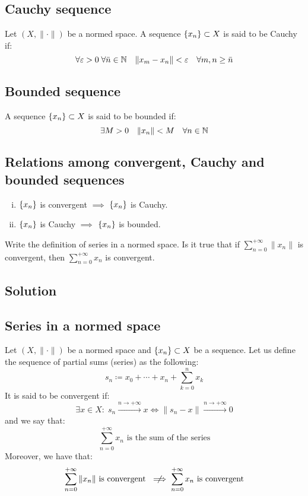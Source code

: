 \subsection{Cauchy sequence}
Let $(X, \| \cdot \|)$ be a normed space. A sequence $\{ x_n \} \subset X$ is said to be Cauchy if:
\[ \forall \varepsilon > 0 \; \forall \bar{n} \in \mathbb{N} \quad \| x_m - x_n \| < \varepsilon \quad \forall m,n \geq \bar{n} \]

\subsection{Bounded sequence}
A sequence $\{ x_n \} \subset X$ is said to be bounded if:
\[ \exists M>0 \quad \|x_n\| < M \quad \forall n \in \mathbb{N} \]

\subsection{Relations among convergent, Cauchy and bounded sequences}
\begin{enumerate}[i)]
    \item $\{ x_n \}$ is convergent $\implies$ $\{ x_n \}$ is Cauchy.
    \item $\{ x_n \}$ is Cauchy $\implies$ $\{ x_n \}$ is bounded.
\end{enumerate}


\question
Write the definition of series in a normed space. Is it true that if $\sum^{+\infty}_{n=0} \|x_n\|$ is convergent, then $\sum^{+\infty}_{n=0} x_n$ is convergent.

\subsection*{Solution}

\subsection{Series in a normed space}
Let $(X, \| \cdot \|)$ be a normed space and $\{ x_n \} \subset X$ be a sequence. Let us define the sequence of partial sums (series) as the following:
\[ s_n \coloneqq x_0 + \cdots + x_n + \sum_{k=0}^n x_k \]
It is said to be convergent if:
\[ \exists x \in X : \; s_n \xrightarrow{n \to +\infty} x \iff \| s_n - x \| \xrightarrow{n \to +\infty} 0 \]
and we say that:
\[ \sum^{+\infty}_{n=0} x_n \text{ is the sum of the series} \]
Moreover, we have that:
\[ \sum^{+\infty}_{n=0} \|x_n\| \text{ is convergent } \centernot\implies \sum^{+\infty}_{n=0} x_n \text{ is convergent} \]

